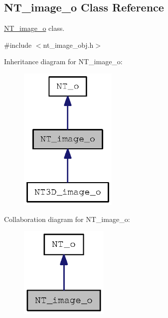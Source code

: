 \subsection{NT\_\-image\_\-o Class Reference}
\label{class_n_t__image__o}


\hyperlink{class_n_t__image__o}{NT\_\-image\_\-o} class.  




{\ttfamily \#include $<$nt\_\-image\_\-obj.h$>$}



Inheritance diagram for NT\_\-image\_\-o:
\nopagebreak
\begin{figure}[H]
\begin{center}
\leavevmode
\includegraphics[width=132pt]{class_n_t__image__o__inherit__graph}
\end{center}
\end{figure}


Collaboration diagram for NT\_\-image\_\-o:
\nopagebreak
\begin{figure}[H]
\begin{center}
\leavevmode
\includegraphics[width=120pt]{class_n_t__image__o__coll__graph}
\end{center}
\end{figure}
